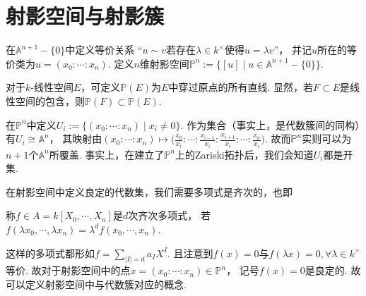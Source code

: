 \def\mapsfrom{\longleftarrow{\raisebox{0.4pt}{$\hspace{-4.8pt}\shortmid$}}}
\section{射影空间与射影簇}
    \begin{definition}
      在$\mathbb{A}^{n+1}-\{0\}$中定义等价关系
      “$u \sim v$若存在$\lambda \in k^{\times}$使得$u=\lambda v$”，
      并记$u$所在的等价类为$u=(x_{0}:\cdots:x_{n})$.
      定义$n$维射影空间$\mathbb{P}^{n}:=\{[u] \mid u \in \mathbb{A}^{n+1}-\{0\}\}$.
    \end{definition}

    对于$k$-线性空间$E$，可定义$\mathbb{P}(E)$为$E$中穿过原点的所有直线. 
    显然，若$F \subset E$是线性空间的包含，则$\mathbb{P}(F) \subset \mathbb{P}(E)$.

    \begin{definition}
      在$\mathbb{P}^{n}$中定义$U_{i}:=\{(x_{0}:\cdots:x_{n}) \mid x_{i} \neq 0\}$.
      作为集合（事实上，是代数簇间的同构）有$U_{i} \cong \mathbb{A}^{n}$，
      其映射由$(x_{0}:\cdots:x_{n}) \mapsto 
      \big(\frac{x_{0}}{x_{i}}:\cdots:\frac{x_{i-1}}{x_{i}}:\frac{x_{i+1}}{x_{i}}:\cdots:\frac{x_{n}}{x_{i}}\big)$. 
      故而$\mathbb{P}^{n}$实则可以为$n+1$个$\mathbb{A}^{n}$所覆盖. 
      事实上，在建立了$\mathbb{P}^{n}$上的Zariski拓扑后，我们会知道$U_{i}$都是开集.
    \end{definition}

    在射影空间中定义良定的代数集，我们需要多项式是齐次的，也即
    \begin{definition}
        称$f \in A=k[X_{0},\cdots,X_{n}]$是$d$次齐次多项式，
        若$f(\lambda x_{0},\cdots,\lambda x_{n})=\lambda^{d}f(x_{0},\cdots,x_{n})$.
    \end{definition}

    这样的多项式都形如$f=\sum_{|I|=d}a_{I}X^{I}$. 
    且注意到$f(x)=0$与$f(\lambda x)=0,\forall \lambda \in k^{\times}$等价. 
    故对于射影空间中的点$x = (x_{0}:\cdots:x_{n}) \in \mathbb{P}^{n}$，
    记号$f(x)=0$是良定的. 故可以定义射影空间中与代数簇对应的概念.


